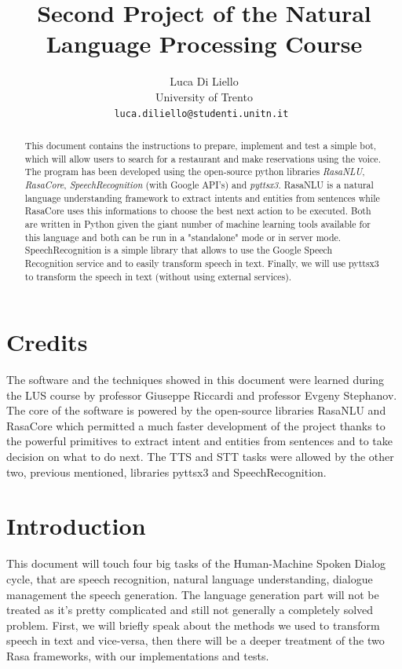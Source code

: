 \documentclass[11pt,a4paper]{article}
\title{Second Project of the Natural Language Processing Course}
\author{Luca Di Liello \\
	University of Trento\\
	{\tt luca.diliello@studenti.unitn.it }
}
\begin{document}
\maketitle

\begin{abstract}

This document contains the instructions to prepare, implement and test a simple bot, which will allow users to search for a restaurant and make reservations using the voice. The program has been developed using the open-source python libraries \textit{RasaNLU}, \textit{RasaCore}, \textit{SpeechRecognition} (with Google API's) and \textit{pyttsx3}. RasaNLU is a natural language understanding framework to extract intents and entities from sentences while RasaCore uses this informations to choose the best next action to be executed. Both are written in Python given the giant number of machine learning tools available for this language and both can be run in a "standalone" mode or in server mode. SpeechRecognition is a simple library that allows to use the Google Speech Recognition service and to easily transform speech in text. Finally, we will use pyttsx3 to transform the speech in text (without using external services).

\end{abstract}

\section{Credits}

The software and the techniques showed in this document were learned during the LUS course by professor Giuseppe Riccardi and professor Evgeny Stephanov. The core of the software is powered by the open-source libraries RasaNLU and RasaCore which permitted a much faster development of the project thanks to the powerful primitives to extract intent and entities from sentences and to take decision on what to do next. The TTS and STT tasks were allowed by the other two, previous mentioned, libraries pyttsx3 and SpeechRecognition.

\section{Introduction}

This document will touch four big tasks of the Human-Machine Spoken Dialog cycle, that are speech recognition,  natural language understanding, dialogue management the speech generation. The language generation part will not be treated as it's pretty complicated and still not generally a completely solved problem. First, we will briefly speak about the methods we used to transform speech in text and vice-versa, then there will be a deeper treatment of the two Rasa frameworks, with our implementations and tests.
\end{document}
